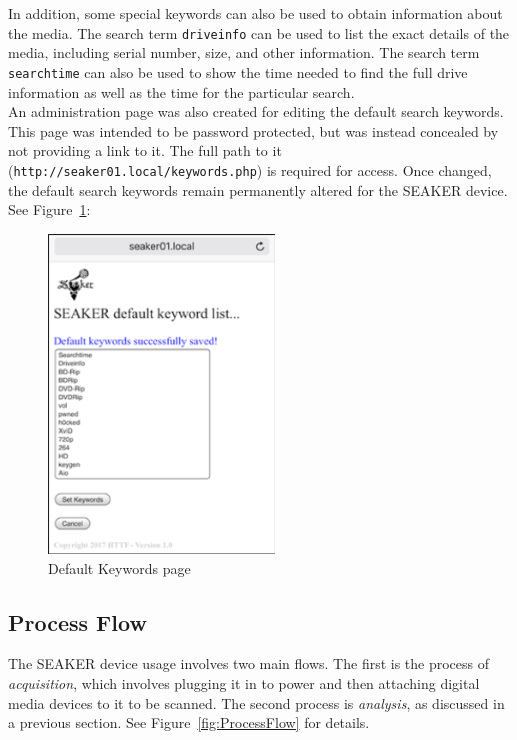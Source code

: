 \documentclass[12pt]{article}
\begin{document}
In addition, some special keywords can also be used to obtain information
about the media.  The search term \verb|driveinfo| can be used to list the exact details of
the media, including serial number, size, and other information.
The search term \verb|searchtime| can also be used to show the time needed to find the
full drive information as well as the time for the particular search.\\

An administration page was also created for editing the default search keywords.
This page was intended to be password protected, but was instead concealed by not
providing a link to it.  The full path to it ({\tt http://seaker01.local/keywords.php})
is required for access.  Once changed, the default search keywords remain permanently
altered for the SEAKER device.  See Figure~\ref{fig:DefaultKeywords}:\\

\begin{figure}[H]
  \begin{center}
  \includegraphics[width=6cm]{images/DefaultKeywords.png}
  \caption{Default Keywords page}
  \label{fig:DefaultKeywords}
  \end{center}
\end{figure}

\subsection{Process Flow}

The SEAKER device usage involves two main flows.  The first is the 
process of {\em acquisition}, which involves plugging it in to power
and then attaching digital media devices to it to be scanned.
The second process is {\em analysis}, as discussed in a
previous section.
See Figure~\ref{fig:ProcessFlow} for details.
\end{document}
